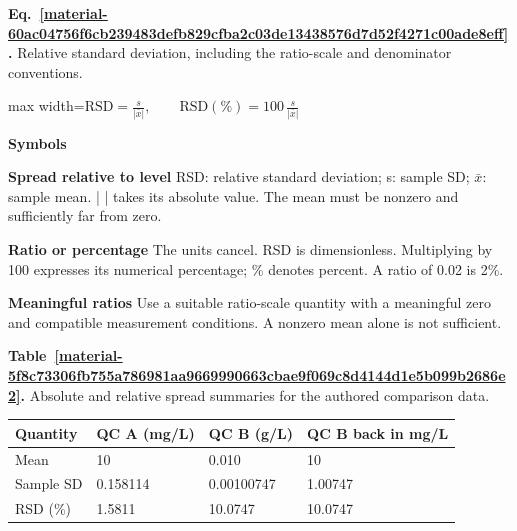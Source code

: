 \documentclass[11pt,a4paper]{article}
\newcounter{scripttable}
\begin{document}
\par\medskip
\noindent\begin{minipage}{\linewidth}
\label{material-60ac04756f6cb239483defb829cfba2c03de13438576d7d52f4271c00ade8eff}
\noindent\textbf{Eq.~\ref*{material-60ac04756f6cb239483defb829cfba2c03de13438576d7d52f4271c00ade8eff}.} Relative standard deviation, including the ratio-scale and denominator conventions.\par\nopagebreak
\begin{center}\begin{adjustbox}{max width=\linewidth}$\displaystyle \mathrm{RSD}=\frac{s}{|\bar{x}|},\qquad\mathrm{RSD}(\%)=100\,\frac{s}{|\bar{x}|}$\end{adjustbox}\end{center}

\par\noindent\textbf{Symbols}

\par\noindent\textbf{Spread relative to level} RSD: relative standard deviation; s: sample SD; \ensuremath{\bar{x}}: sample mean. | | takes its absolute value. The mean must be nonzero and sufficiently far from zero.

\par\noindent\textbf{Ratio or percentage} The units cancel. RSD is dimensionless. Multiplying by 100 expresses its numerical percentage; \% denotes percent. A ratio of 0.02 is 2\%.

\par\noindent\textbf{Meaningful ratios} Use a suitable ratio-scale quantity with a meaningful zero and compatible measurement conditions. A nonzero mean alone is not sufficient.

\end{minipage}\par
\medskip

\par\medskip
{}
\label{material-5f8c73306fb755a786981aa9669990663cbae9f069c8d4144d1e5b099b2686e2}
\noindent\textbf{Table~\ref*{material-5f8c73306fb755a786981aa9669990663cbae9f069c8d4144d1e5b099b2686e2}.} Absolute and relative spread summaries for the authored comparison data.\par\nopagebreak
\begin{longtable}{@{}p{}p{}p{}p{}@{}}
Quantity & QC A (mg/L) & QC B (g/L) & QC B back in mg/L \\ \hline
\endhead
Mean & 10 & 0.010 & 10 \\ \hline
Sample SD & 0.158114 & 0.00100747 & 1.00747 \\ \hline
RSD (\%) & 1.5811 & 10.0747 & 10.0747 \\ \hline
\end{longtable}
\medskip
\end{document}
